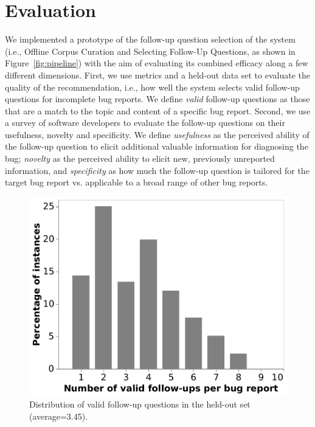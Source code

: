 \section{Evaluation}

We implemented a prototype of the follow-up question selection of the \evpi system (i.e., Offline Corpus Curation and Selecting Follow-Up Questions, as shown in Figure~\ref{fig:pipeline}) with the aim of evaluating its combined efficacy along
a few different dimensions. First, we use metrics and a held-out data set to evaluate the quality
of the recommendation, i.e., how well the system selects valid follow-up questions for incomplete bug reports. We define {\em valid} follow-up questions as those that are a match to the topic and content of a specific bug report.
Second, we use a survey of software developers to evaluate the follow-up questions on their usefulness, novelty and specificity. We define {\em usefulness} as the perceived ability of the follow-up question to elicit additional valuable information for diagnosing the bug; {\em novelty} as the perceived ability to elicit new, previously unreported information, and {\em specificity} as how much the follow-up question is tailored for the target bug report vs. applicable to a broad range of other bug reports.

\begin{figure}
	\centering
	\includegraphics[width=0.8\linewidth]{figures/viz_annotation.pdf}
	\caption{Distribution of valid follow-up questions in the held-out set (average=3.45).}
	\label{fig:annotation}
\end{figure}

\newcommand*{\tab}{\hspace*{0.5cm}}%

